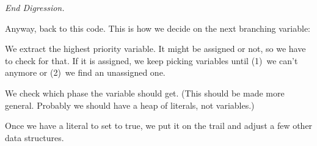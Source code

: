 \endnumberedlist \hfill{\it End Digression.}

Anyway, back to this code. This is how we decide on the next branching
variable:

\numberedlist

\li We extract the highest priority variable. It might be assigned or not, so
we
have to check for that. If it is assigned, we keep picking variables until
(1)~we can't anymore or (2)~we find an unassigned one.

\li We check which phase the variable should get. (This should be made more
general. Probably we should have a heap of literals, not variables.)

\li Once we have a literal to set to true, we put it on the trail and adjust a
few other data structures.

\endnumberedlist

